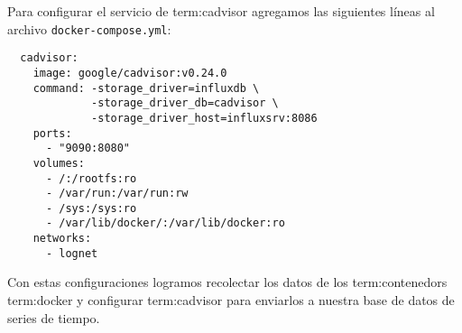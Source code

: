 Para configurar el servicio de \gls{term:cadvisor} agregamos las siguientes
líneas al archivo \lstinline{docker-compose.yml}:

\begin{lstlisting}
  cadvisor:
    image: google/cadvisor:v0.24.0
    command: -storage_driver=influxdb \
             -storage_driver_db=cadvisor \
             -storage_driver_host=influxsrv:8086
    ports:
      - "9090:8080"
    volumes:
      - /:/rootfs:ro
      - /var/run:/var/run:rw
      - /sys:/sys:ro
      - /var/lib/docker/:/var/lib/docker:ro
    networks:
      - lognet
\end{lstlisting}

Con estas configuraciones logramos recolectar los datos de los
\glspl{term:contenedor} \gls{term:docker} y configurar \gls{term:cadvisor} para
enviarlos a nuestra base de datos de series de tiempo.
